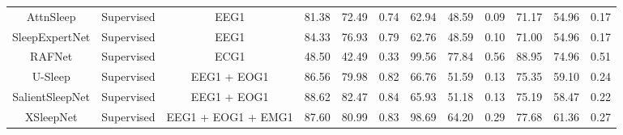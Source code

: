 \begin{table*}[!htbp]
{{\begin{tabular}{c|c|c|ccc|ccc|ccc}
AttnSleep \cite{ref4}                                                                     & Supervised                             & EEG1                                       & 81.38          & 72.49          & 0.74                                                    & 62.94          & 48.59          & 0.09                                        & 71.17          & 54.96          & 0.17                                           \\
SleepExpertNet \cite{ref5}                                                                & Supervised                             & EEG1                                       & 84.33          & 76.93          & 0.79                                                    & 62.76          & 48.59          & 0.10                                        & 71.00          & 54.96          & 0.17                                           \\
RAFNet \cite{ref7}                                                                        & Supervised                             & ECG1                                       & 48.50          & 42.49          & 0.33                                                    & 99.56          & 77.84          & 0.56                                        & 88.95          & 74.96          & 0.51                                           \\ 
\hline
U-Sleep \cite{ref8}                                                                       & Supervised                             & EEG1
  + EOG1                              & 86.56          & 79.98          & 0.82                                                    & 66.76          & 51.59          & 0.13                                        & 75.35          & 59.10          & 0.24                                           \\
SalientSleepNet \cite{ref9}                                                               & Supervised                             & EEG1 + EOG1                                & 88.62          & 82.47          & 0.84                                                    & 65.93          & 51.18          & 0.13                                        & 75.19          & 58.47          & 0.22                                           \\
XSleepNet \cite{ref10}                                                                     & Supervised                             & EEG1 + EOG1 + EMG1                         & 87.60          & 80.99          & 0.83                                                    & 98.69          & 64.20          & 0.29                                        & 77.68          & 61.36          & 0.27                                           \\

\end{tabular}}}
\end{table*}
